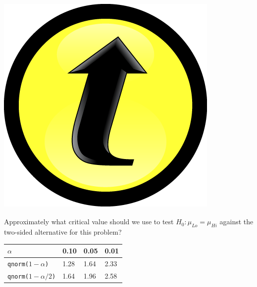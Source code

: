 \documentclass[handout]{beamer}
\begin{document}
\begin{frame}
\frametitle{\hfill \includegraphics[scale = 0.05]{./images/clicker}}
Approximately what critical value should we use to test $H_0\colon \mu_{Lo} = \mu_{Hi}$ against the two-sided alternative for this problem?


\vspace{1em}
\begin{center}
\begin{tabular}{l|lll}
$\alpha$ &   0.10& 0.05 &0.01\\
\hline
\texttt{qnorm($1-\alpha$)} & 1.28 &1.64 &2.33\\
\texttt{qnorm($1-\alpha/2$)} &1.64 &1.96& 2.58
\end{tabular}
\end{center}
\vspace{8em}
\end{frame}
\end{document}
